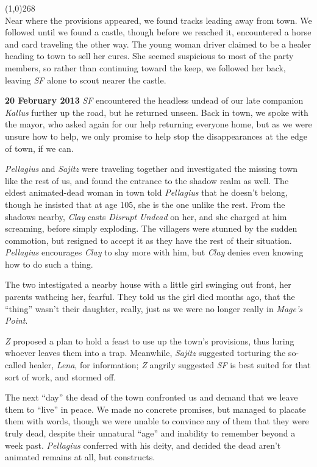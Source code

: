 \documentclass[letterpaper]{article}
\newcommand{\colline}{\noindent\line(1,0){268} \\}
\newcommand{\e}[1]{\emph{#1}}
\newcommand{\B}[1]{\textbf{#1}}
\newenvironment{notesection}[1]
{\noindent {\huge \B{#1}} \par
\vspace{-0.75em}
\colline
\begingroup\fontsize{9pt}{12pt}\selectfont}
{\endgroup}
\begin{document}
\begin{notesection}{Events}
Near where the provisions appeared, we found tracks leading away from town.  We followed until we found a castle, though before we reached it, encountered a horse and card traveling the other way.  The young woman driver claimed to be a healer heading to town to sell her cures.  She seemed suspicious to most of the party members, so rather than continuing toward the keep, we followed her back, leaving \e{SF} alone to scout nearer the castle.


\B{20 February 2013} \e{SF} encountered the headless undead of our late companion \e{Kallus} further up the road, but he returned unseen.  Back in town, we spoke with the mayor, who asked again for our help returning everyone home, but as we were unsure how to help, we only promise to help stop the disappearances at the edge of town, if we can.

\e{Pellagius} and \e{Sajitz} were traveling together and investigated the missing town like the rest of us, and found the entrance to the shadow realm as well.  The eldest animated-dead woman in town told \e{Pellagius} that he doesn't belong, though he insisted that at age 105, she is the one unlike the rest.  From the shadows nearby, \e{Clay} casts \e{Disrupt Undead} on her, and she charged at him screaming, before simply exploding.  The villagers were stunned by the sudden commotion, but resigned to accept it as they have the rest of their situation.  \e{Pellagius} encourages \e{Clay} to slay more with him, but \e{Clay} denies even knowing how to do such a thing.

The two intestigated a nearby house with a little girl swinging out front, her parents wathcing her, fearful. They told us the girl died months ago, that the ``thing'' wasn't their daughter, really, just as we were no longer really in \e{Mage's Point}.

\e{Z} proposed a plan to hold a feast to use up the town's provisions, thus luring whoever leaves them into a trap.  Meanwhile, \e{Sajitz} suggested torturing the so-called healer, \e{Lena}, for information; \e{Z} angrily suggested \e{SF} is best suited for that sort of work, and stormed off.

The next ``day'' the dead of the town confronted us and demand that we leave them to ``live'' in peace.  We made no concrete promises, but managed to placate them with words, though we were unable to convince any of them that they were truly dead, despite their unnatural ``age'' and inability to remember beyond a week past.  \e{Pellagius} conferred with his deity, and decided the dead aren't animated remains at all, but constructs.


\end{notesection}
\end{document}
